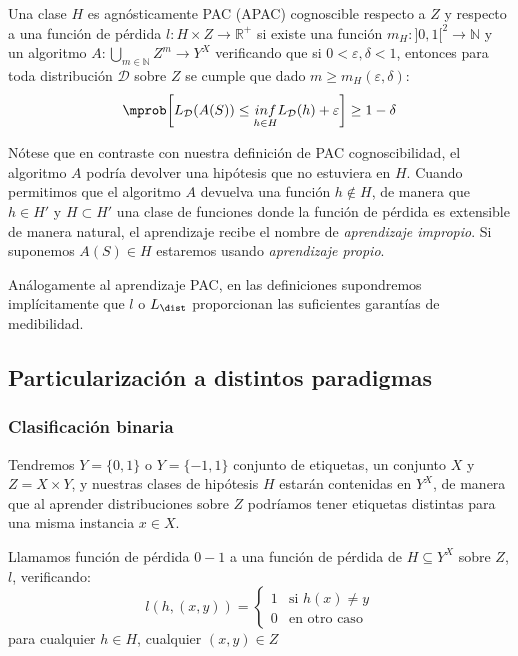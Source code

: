 \begin{definition}
Una clase $H$ es agnósticamente PAC (APAC) cognoscible respecto a $Z$ y respecto a una función de pérdida 
$l: H \times Z \rightarrow \mathbb{R}^{+}$ si existe una función 
$m_{H} : ]0,1[^2\rightarrow \mathbb{N}$ y un algoritmo 
$A: \underset{m\in \mathbb{N}}{\bigcup} Z^m \rightarrow Y^X$ verificando que si 
$0 < \varepsilon, \delta < 1$, entonces para toda distribución $\mathcal{D}$ sobre $Z$
se cumple que dado $m\ge m_{H}(\varepsilon, \delta)$:
\[\mprob \bigg[L_{\mathcal{D}}(A(S)) \le \underset{h\in H}{inf} L_{\mathcal{D}}(h) + \varepsilon \bigg] \ge 1-\delta\]
\end{definition}

Nótese que en contraste con nuestra definición de PAC cognoscibilidad, el algoritmo $A$ podría devolver una 
hipótesis que no estuviera en $H$. Cuando permitimos que el algoritmo $A$ devuelva una función 
$h \notin H$, de manera que $h \in H'$ y  $H \subset H'$ una clase de funciones donde la función de pérdida 
es extensible de manera natural, el aprendizaje recibe el nombre de \textit{aprendizaje impropio}. Si suponemos
$A(S) \in H$ estaremos usando \textit{aprendizaje propio}.

Análogamente al aprendizaje PAC, en las definiciones supondremos implícitamente que $l$ o $L_{\dist}$ proporcionan las suficientes
garantías de medibilidad.

\subsection{Particularización a distintos paradigmas}

\subsubsection{Clasificación binaria}
\label{sec:clas-binaria}

Tendremos $Y=\{0,1\}$ o $Y=\{-1,1\}$ conjunto de etiquetas, un conjunto $X$ y $Z=X\times Y$, y nuestras clases
de hipótesis $H$ estarán contenidas en $Y^X$, de manera que al aprender distribuciones sobre $Z$ podríamos 
tener etiquetas distintas para una misma instancia $x \in X$.

\begin{definition}
Llamamos función de pérdida $0-1$ a una función de pérdida de $H\subseteq Y^X$ sobre $Z$, $l$, verificando:
\[
  l(h, (x,y)) = \left\{\begin{array}{ll}
                        1 & \textrm{si } h(x)\neq y\\
                        0 & \textrm{en otro caso}
                        \end{array}\right.
\]
para cualquier $h\in H$, cualquier $(x,y) \in Z$
\label{def:zero-one-loss}
\end{definition}

